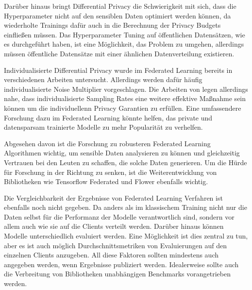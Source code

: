 Darüber hinaus bringt Differential Privacy die Schwierigkeit mit sich, dass die Hyperparameter nicht auf den sensiblen Daten optimiert werden können, da wiederholte Trainings dafür auch in die Berechnung der Privacy Budgets einfließen müssen. Das Hyperparameter Tuning auf öffentlichen Datensätzen, wie es \textcite{ramaswamy:2020} durchgeführt haben, ist eine Möglichkeit, das Problem zu umgehen, allerdings müssen öffentliche Datensätze mit einer ähnlichen Datenverteilung existieren.

Individualisierte Differential Privacy wurde im Federated Learning bereits in verschiedenen Arbeiten untersucht. Allerdings werden dafür häufig individualisierte Noise Multiplier vorgeschlagen. Die Arbeiten von \textcite{jorgensen:2015, boenisch:2023} legen allerdings nahe, dass individualisierte Sampling Rates eine weitere effektive Maßnahme sein können um die individuellenn Privacy Garantien zu erfüllen. Eine umfassendere Forschung dazu im Federated Learning könnte helfen, das private und datensparsam trainierte Modelle zu mehr Popularität zu verhelfen.

Abgesehen davon ist die Forschung zu robusteren Federated Learning Algorithmen wichtig, um sensible Daten analysieren zu können und gleichzeitig Vertrauen bei den Leuten zu schaffen, die solche Daten generieren. Um die Hürde für Forschung in der Richtung zu senken, ist die Weiterentwicklung von Bibliotheken wie Tensorflow Federated und Flower \cite{beutel:2020} ebenfalls wichtig. 

Die Vergleichbarkeit der Ergebnisse von Federated Learning Verfahren ist ebenfalls noch nicht gegeben. Da anders als im klassischem Training nicht nur die Daten selbst für die Performanz der Modelle verantwortlich sind, sondern vor allem auch wie sie auf die Clients verteilt werden. Darüber hinaus können Modelle unterschiedlich evaluiert werden. Eine Möglichkeit ist dies zentral zu tun, aber es ist auch möglich Durchschnittsmetriken von Evaluierungen auf den einzelnen Clients anzugeben. All diese Faktoren sollten mindestens auch angegeben werden, wenn Ergebnisse publiziert werden. Idealerweise sollte auch die Verbreitung von Bibliotheken unabhängigen Benchmarks vorangetrieben werden.